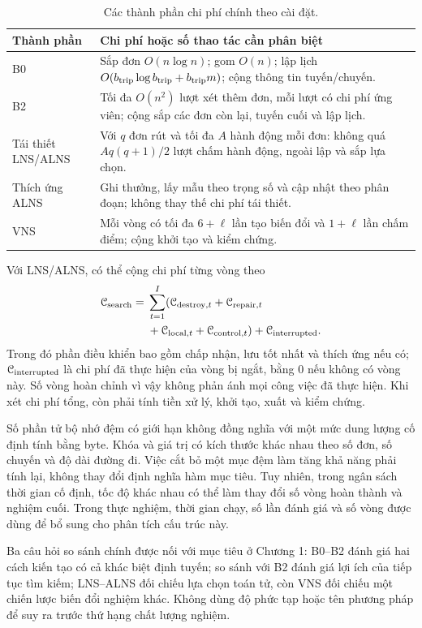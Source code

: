 \begin{table}[H]
\centering\small
\begin{tabularx}{\linewidth}{lX}
\toprule
Thành phần & Chi phí hoặc số thao tác cần phân biệt \\
\midrule
B0 & Sắp đơn $O(n\log n)$; gom $O(n)$; lập lịch $O(b_{\rm trip}\log b_{\rm trip}+b_{\rm trip}m)$; cộng thông tin tuyến/chuyến. \\
B2 & Tối đa $O(n^2)$ lượt xét thêm đơn, mỗi lượt có chi phí ứng viên; cộng sắp các đơn còn lại, tuyến cuối và lập lịch. \\
Tái thiết LNS/ALNS & Với $q$ đơn rút và tối đa $A$ hành động mỗi đơn: không quá $Aq(q+1)/2$ lượt chấm hành động, ngoài lập và sắp lựa chọn. \\
Thích ứng ALNS & Ghi thưởng, lấy mẫu theo trọng số và cập nhật theo phân đoạn; không thay thế chi phí tái thiết. \\
VNS & Mỗi vòng có tối đa $6+\ell$ lần tạo biến đổi và $1+\ell$ lần chấm điểm; cộng khởi tạo và kiểm chứng. \\
\bottomrule
\end{tabularx}
\caption{Các thành phần chi phí chính theo cài đặt.}\label{tab:method-costs}
\end{table}

Với LNS/ALNS, có thể cộng chi phí từng vòng theo
\begin{equation}
 \begin{aligned}
 \mathcal C_{\rm search}={}&\sum_{t=1}^{I}
 (\mathcal C_{{\rm destroy},t}+\mathcal C_{{\rm repair},t}\\
 &+\mathcal C_{{\rm local},t}+\mathcal C_{{\rm control},t})
 +\mathcal C_{\rm interrupted}.
 \end{aligned}\label{eq:search-cost-sum}
\end{equation}
Trong đó phần điều khiển bao gồm chấp nhận, lưu tốt nhất và thích ứng nếu có; $\mathcal C_{\rm interrupted}$ là chi phí đã thực hiện của vòng bị ngắt, bằng $0$ nếu không có vòng này. Số vòng hoàn chỉnh vì vậy không phản ánh mọi công việc đã thực hiện. Khi xét chi phí tổng, còn phải tính tiền xử lý, khởi tạo, xuất và kiểm chứng.

Số phần tử bộ nhớ đệm có giới hạn không đồng nghĩa với một mức dung lượng cố định tính bằng byte. Khóa và giá trị có kích thước khác nhau theo số đơn, số chuyến và độ dài đường đi. Việc cắt bỏ một mục đệm làm tăng khả năng phải tính lại, không thay đổi định nghĩa hàm mục tiêu. Tuy nhiên, trong ngân sách thời gian cố định, tốc độ khác nhau có thể làm thay đổi số vòng hoàn thành và nghiệm cuối. Trong thực nghiệm, thời gian chạy, số lần đánh giá và số vòng được dùng để bổ sung cho phân tích cấu trúc này.

Ba câu hỏi so sánh chính được nối với mục tiêu ở Chương 1: B0--B2 đánh giá hai cách kiến tạo có cả khác biệt định tuyến; so sánh với B2 đánh giá lợi ích của tiếp tục tìm kiếm; LNS--ALNS đối chiếu lựa chọn toán tử, còn VNS đối chiếu một chiến lược biến đổi nghiệm khác. Không dùng độ phức tạp hoặc tên phương pháp để suy ra trước thứ hạng chất lượng nghiệm.
